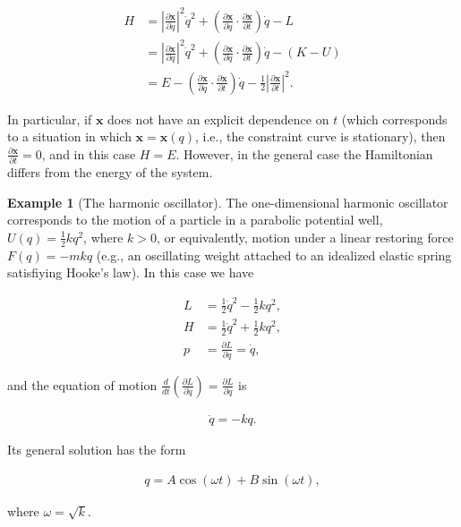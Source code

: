 \documentclass[11pt]{report}
\theoremstyle{plain}
\theoremstyle{definition}
\newtheorem{example}[thm]{Example}
\begin{document}
\begin{align*}
H &=
\left|\frac{\partial \mathbf{x}}{\partial q}\right|^2 \dot{q}^2 + \left(\frac{\partial \mathbf{x}}{\partial q}\cdot\frac{\partial \mathbf{x}}{\partial t}\right)\dot{q} - L \\
&=
\left|\frac{\partial \mathbf{x}}{\partial q}\right|^2 \dot{q}^2 + \left(\frac{\partial \mathbf{x}}{\partial q}\cdot\frac{\partial \mathbf{x}}{\partial t}\right)\dot{q} - (K-U) \\
&= E - \left(\frac{\partial \mathbf{x}}{\partial q}\cdot\frac{\partial \mathbf{x}}{\partial t}\right)\dot{q} -
\tfrac12\left|\frac{\partial \mathbf{x}}{\partial t}\right|^2.
\end{align*}

In particular, if $\mathbf{x}$ does not have an
explicit dependence on $t$ (which corresponds to a
situation in which $\mathbf{x}=\mathbf{x}(q)$, i.e.,
the constraint curve is stationary), then
$\frac{\partial \mathbf{x}}{\partial t}=0$, and in
this case $H=E$. However, in the general case the
Hamiltonian differs from the energy of the system.

\begin{example}[The harmonic oscillator]
The one-dimensional harmonic oscillator corresponds
to the motion of a particle in a parabolic potential
well, $U(q)=\tfrac12 k q^2$, where $k>0$, or
equivalently, motion under a linear restoring force
$F(q)=-m k q$ (e.g., an oscillating weight attached
to an idealized elastic spring satisfiying Hooke's
law). In this case we have

\begin{align*}
L &= \tfrac12 \dot{q}^2 - \tfrac12 kq^2, \\
H &= \tfrac12 \dot{q}^2 + \tfrac12 kq^2, \\
p &= \frac{\partial L}{\partial \dot{q}} = \dot{q},
\end{align*}

and the equation of motion
$\frac{d}{dt}\left(\frac{\partial L}{\partial
\dot{q}}\right)=\frac{\partial L}{\partial q}$
is

\begin{align*}
\ddot{q} = -kq.
\end{align*}

Its general solution has the form

\begin{align*}
q = A\cos(\omega t) + B \sin(\omega t),
\end{align*}

where $\omega= \sqrt{k}$.
\end{example}
\end{document}
